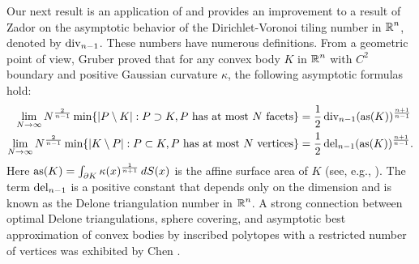Our next result is an application of \cite{kur2017approximation} and provides an improvement to a result of Zador \cite{zador1982asymptotic} on the asymptotic behavior of the Dirichlet-Voronoi tiling number in $\operatorname{\mathbb{R}}^n$, denoted by $\operatorname{div}_{n-1}$.
These numbers have numerous definitions. From a geometric point of view, Gruber \cite{GruberII} proved that for any convex body $ K $ in $\operatorname{\mathbb{R}}^n$ with  $C^2$ boundary and  positive Gaussian curvature $\kappa$, the following asymptotic formulas hold:
\begin{align}\label{GruberOutEqn}
\lim_{N\to\infty}N^{\frac{2}{n-1}}\min\{|P\setminus K|: P\supset K, P\text{ has at most }N \text{ facets}\} &= \frac{1}{2}\operatorname{div}_{n-1}(\operatorname{as}(K))^{\frac{n+1}{n-1}}\\
\label{GruberInEqn}
\lim_{N\to\infty}N^{\frac{2}{n-1}}\min\{|K\setminus P|: P\subset K, P\text{ has at most }N \text{ vertices}\} &= \frac{1}{2}\operatorname{del}_{n-1}(\operatorname{as}(K))^{\frac{n+1}{n-1}}.
\end{align}
Here $\operatorname{as}(K)=\int_{\partial K}\kappa(x)^{\frac{1}{n+1}}\,dS(x)$ is the affine surface area of $K$ (see, e.g., \cite{SchneiderBook}). 
The term $\operatorname{del}_{n-1}$ is a positive constant that depends only on the dimension and is known as the Delone triangulation number in $\operatorname{\mathbb{R}}^n$. A strong connection between  optimal Delone triangulations, sphere covering, and asymptotic best approximation of convex bodies by inscribed polytopes with a restricted number of vertices was exhibited by Chen \cite{chen}.

